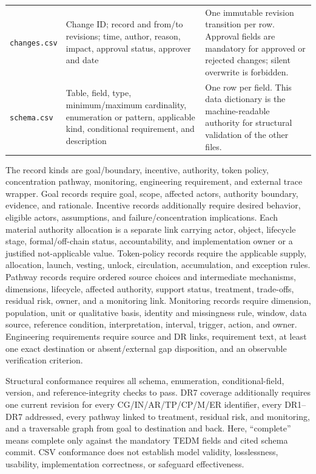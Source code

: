 \documentclass[10pt]{article}
\begin{document}
{\begin{longtable}{@{}p{.15\linewidth}p{.45\linewidth}p{.32\linewidth}@{}}
\texttt{changes.csv} & Change ID; record and from/to revisions; time, author, reason, impact, approval status, approver and date & One immutable revision transition per row. Approval fields are mandatory for approved or rejected changes; silent overwrite is forbidden. \\
\texttt{schema.csv} & Table, field, type, minimum/maximum cardinality, enumeration or pattern, applicable kind, conditional requirement, and description & One row per field. This data dictionary is the machine-readable authority for structural validation of the other files. \\
\bottomrule
\end{longtable}
}

The record kinds are goal/boundary, incentive, authority, token policy,
concentration pathway, monitoring, engineering requirement, and external trace
wrapper. Goal records
require goal, scope, affected actors, authority boundary, evidence, and
rationale. Incentive records additionally require desired behavior, eligible
actors, assumptions, and failure/concentration implications. Each material
authority allocation is a separate link carrying actor, object, lifecycle
stage, formal/off-chain status, accountability, and implementation owner or a
justified not-applicable value. Token-policy records require the applicable
supply, allocation, launch, vesting, unlock, circulation, accumulation, and
exception rules. Pathway records require ordered source choices and intermediate
mechanisms, dimensions, lifecycle, affected authority, support status,
treatment, trade-offs, residual risk, owner, and a monitoring link. Monitoring
records require dimension, population, unit or qualitative basis, identity and
missingness rule, window, data source, reference condition, interpretation,
interval, trigger, action, and owner. Engineering requirements require source
and DR links, requirement text, at least one exact destination or absent/external
gap disposition, and an observable verification criterion.

Structural conformance requires all schema, enumeration, conditional-field,
version, and reference-integrity checks to pass. DR7 coverage additionally
requires one current revision for every CG/IN/AR/TP/CP/M/ER identifier, every
DR1--DR7 addressed, every pathway linked to treatment, residual risk, and
monitoring, and a traversable graph from goal to destination and back. Here,
``complete'' means complete only against the mandatory TEDM fields and cited
schema commit. CSV conformance does not establish model validity, losslessness,
usability, implementation correctness, or safeguard effectiveness.
\end{document}
